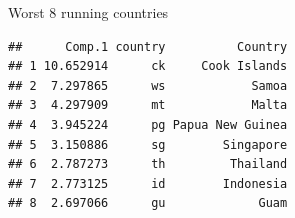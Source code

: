 \documentclass[ignorenonframetext,]{beamer}
\newenvironment{Shaded}{\begin{snugshade}}{\end{snugshade}}
\newcommand{\DataTypeTok}[1]{\textcolor[rgb]{0.13,0.29,0.53}{#1}}
\newcommand{\DecValTok}[1]{\textcolor[rgb]{0.00,0.00,0.81}{#1}}
\newcommand{\FloatTok}[1]{\textcolor[rgb]{0.00,0.00,0.81}{#1}}
\newcommand{\KeywordTok}[1]{\textcolor[rgb]{0.13,0.29,0.53}{\textbf{#1}}}
\newcommand{\NormalTok}[1]{#1}
\newcommand{\OperatorTok}[1]{\textcolor[rgb]{0.81,0.36,0.00}{\textbf{#1}}}
\newcommand{\StringTok}[1]{\textcolor[rgb]{0.31,0.60,0.02}{#1}}
\begin{document}
\begin{frame}[fragile]{Worst 8 running countries}
\protect\hypertarget{worst-8-running-countries}{}

\footnotesize

\begin{Shaded}
\end{Shaded}

\begin{verbatim}
##      Comp.1 country          Country
## 1 10.652914      ck     Cook Islands
## 2  7.297865      ws            Samoa
## 3  4.297909      mt            Malta
## 4  3.945224      pg Papua New Guinea
## 5  3.150886      sg        Singapore
## 6  2.787273      th         Thailand
## 7  2.773125      id        Indonesia
## 8  2.697066      gu             Guam
\end{verbatim}

\normalsize

\end{frame}
\end{document}
